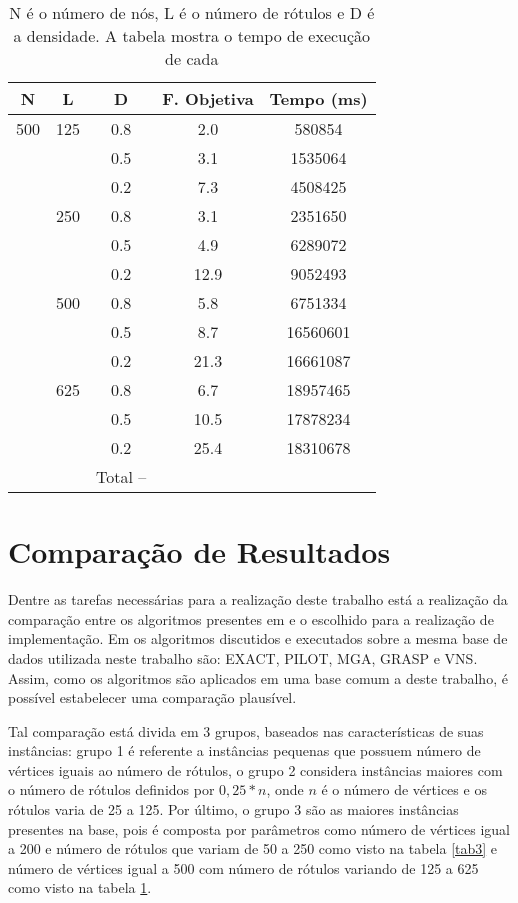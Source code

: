 \documentclass{sig-alternate-05-2015}
\begin{document}
\begin{table}[!h]
	\begin{tabular}{ccccc}
		\hline \rule[-2ex]{0pt}{5.5ex} N & L & D  & F. Objetiva & Tempo (ms) \\ 
		\hline \rule[-2ex]{0pt}{5.5ex} 500 & 125 & 0.8 & 2.0 & 580854 \\ 
		\hline \rule[-2ex]{0pt}{5.5ex}  &  & 0.5 & 3.1 & 1535064 \\ 
		\hline \rule[-2ex]{0pt}{5.5ex}  &  & 0.2 & 7.3 & 4508425 \\ 
		\hline \rule[-2ex]{0pt}{5.5ex}  & 250 & 0.8 & 3.1 & 2351650 \\ 
		\hline \rule[-2ex]{0pt}{5.5ex}  &  & 0.5 & 4.9 & 6289072 \\ 
		\hline \rule[-2ex]{0pt}{5.5ex}  &  & 0.2 & 12.9 & 9052493 \\ 
		\hline \rule[-2ex]{0pt}{5.5ex}  & 500 & 0.8 & 5.8 & 6751334 \\ 
		\hline \rule[-2ex]{0pt}{5.5ex}  &  & 0.5 & 8.7 & 16560601 \\ 
		\hline \rule[-2ex]{0pt}{5.5ex}  &  & 0.2 & 21.3 & 16661087 \\ 
		\hline \rule[-2ex]{0pt}{5.5ex}  & 625 & 0.8 & 6.7 & 18957465 \\ 
		\hline \rule[-2ex]{0pt}{5.5ex}  &  & 0.5 & 10.5 & 17878234 \\ 
		\hline \rule[-2ex]{0pt}{5.5ex}  &  & 0.2 & 25.4 & 18310678 \\ 
		\hline \rule[-2ex]{0pt}{5.5ex}  &  & Total -- &  &  \\ 
		\hline 
	\end{tabular}  
	\caption{N é o número de nós, L é o número de rótulos e D é a densidade.  A tabela mostra o tempo de execução de cada}
	\label{tab4}
\end{table}
\section{Comparação de Resultados} \label{sec5}
Dentre as tarefas necessárias para a realização deste trabalho está a realização da comparação entre os algoritmos presentes em \cite{} e o escolhido para a realização de implementação. Em \cite{} os algoritmos discutidos e executados sobre a mesma base de dados utilizada neste trabalho são: EXACT, PILOT, MGA, GRASP e VNS. Assim, como os algoritmos são aplicados em uma base comum a deste trabalho, é possível estabelecer uma comparação plausível. 

Tal comparação está divida em 3 grupos, baseados nas características de suas instâncias: grupo 1 é referente a instâncias pequenas que possuem número de vértices iguais ao número de rótulos, o grupo 2 considera instâncias maiores com o número de rótulos definidos por $0,25 * n$, onde $n$ é o número de vértices e os rótulos varia de 25 a 125. Por último, o grupo 3 são as maiores instâncias presentes na base, pois é composta por parâmetros como número de vértices igual a 200 e número de rótulos que variam de 50 a 250 como visto na tabela \ref{tab3} e número de vértices igual a 500 com número de rótulos variando de 125 a 625 como visto na tabela \ref{tab4}.
\end{document}

